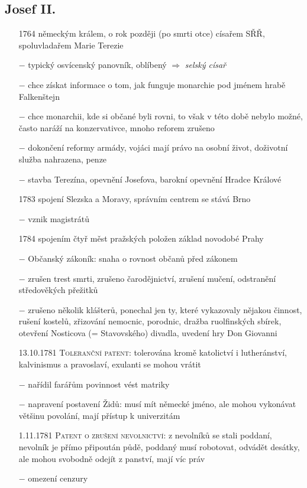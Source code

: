 \documentclass{article}
\begin{document}
\subsection*{Josef II.}
\begin{itemize}
    \vspace{-0.5em}
    \setlength\itemsep{0.15em}
    \item[1764] německým králem, o rok později (po smrti otce) císařem SŘŘ, spoluvladařem Marie Terezie
    \item[$-$] typický osvícenský panovník, oblíbený $\Rightarrow$ \textit{selský císař}
    \item[$-$] chce získat informace o tom, jak funguje monarchie pod jménem hrabě Falkenštejn
    \item[$-$] chce monarchii, kde si občané byli rovni, to však v této době nebylo možné, často naráží na konzervativce, mnoho reforem zrušeno
    \item[$-$] dokončení reformy armády, vojáci mají právo na osobní život, doživotní služba nahrazena, penze
    \item[$-$] stavba Terezína, opevnění Josefova, barokní opevnění Hradce Králové
    \item[1783] spojení Slezska a Moravy, správním centrem se stává Brno
    \item[$-$] vznik magistrátů
    \item[1784] spojením čtyř měst pražských položen základ novodobé Prahy
    \item[$-$] Občanský zákoník: snaha o rovnost občanů před zákonem
    \item[$-$] zrušen trest smrti, zrušeno čarodějnictví, zrušení mučení, odstranění středověkých přežitků
    \item[$-$] zrušeno několik klášterů, ponechal jen ty, které vykazovaly nějakou činnost, rušení kostelů, zřizování nemocnic, porodnic, dražba ruolfinských sbírek, otevření Nosticova (= Stavovského) divadla, uvedení hry Don Giovanni
    \item[13.10.1781] \textsc{Toleranční patent}: tolerována kromě katolictví i lutheránství, kalvinismus a pravoslaví, exulanti se mohou vrátit
    \item[$-$] nařídil farářům povinnost vést matriky
    \item[$-$] napravení postavení Židů: musí mít německé jméno, ale mohou vykonávat většinu povolání, mají přístup k univerzitám
    \item[1.11.1781] \textsc{Patent o zrušení nevolnictví}: z nevolníků se stali poddaní, nevolník je přímo připoután půdě, poddaný musí robotovat, odvádět desátky, ale mohou svobodně odejít z panství, mají víc práv
    \item[$-$] omezení cenzury
\end{itemize}
\end{document}
